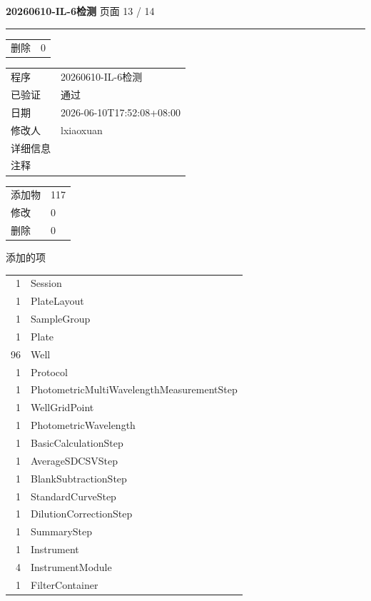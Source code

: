\documentclass[UTF8,10pt,a4paper,fontset=fandol]{ctexart}
\begin{document}
\begin{flushleft}
\small
\textbf{20260610-IL-6检测} \hfill 页面 13 / 14

\hrule

\vspace{0.5em}

\begin{tabular}{@{}ll}
删除 & 0
\end{tabular}

\vspace{0.5em}

\begin{tabular}{@{}ll}
程序 & 20260610-IL-6检测\\
已验证 & 通过\\
日期 & 2026-06-10T17:52:08+08:00\\
修改人 & lxiaoxuan\\
详细信息 & \\
注释 & \\
\end{tabular}

\vspace{0.5em}

\begin{tabular}{@{}ll}
添加物 & 117\\
修改 & 0\\
删除 & 0
\end{tabular}

\vspace{0.5em}

添加的项

\begin{tabular}{@{}rl}
1 & Session\\
1 & PlateLayout\\
1 & SampleGroup\\
1 & Plate\\
96 & Well\\
1 & Protocol\\
1 & PhotometricMultiWavelengthMeasurementStep\\
1 & WellGridPoint\\
1 & PhotometricWavelength\\
1 & BasicCalculationStep\\
1 & AverageSDCSVStep\\
1 & BlankSubtractionStep\\
1 & StandardCurveStep\\
1 & DilutionCorrectionStep\\
1 & SummaryStep\\
1 & Instrument\\
4 & InstrumentModule\\
1 & FilterContainer
\end{tabular}


\end{flushleft}
\end{document}

